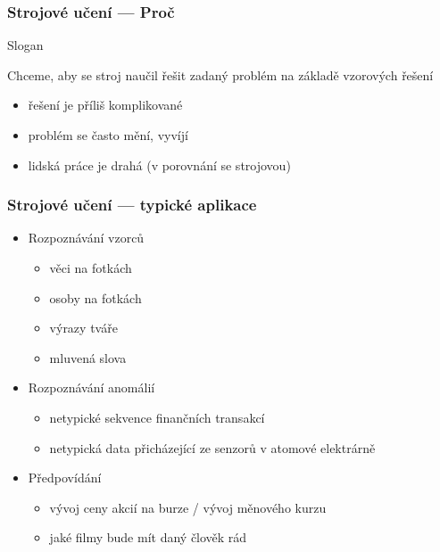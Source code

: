 \documentclass[red,professionalfont]{beamer}
\theoremstyle{definition}
\newcommand{\0}{\mbox{${\bf 0}$}}
\begin{document}
\begin{frame}\frametitle{Strojové učení --- Proč}
\begin{center}
 Slogan
\end{center}\pause
\begin{block}{}
 \begin{center} 
  Chceme, aby se stroj naučil řešit zadaný problém na základě vzorových řešení
 \end{center}
\end{block}\pause
\begin{itemize}
 \item řešení je příliš komplikované\pause
 \item problém se často mění, vyvíjí\pause
 \item lidská práce je drahá (v porovnání se strojovou)
\end{itemize}
\end{frame}

\begin{frame}\frametitle{Strojové učení --- typické aplikace}
\begin{itemize}
 \item Rozpoznávání vzorců\pause
 \begin{itemize}
 \item věci na fotkách\pause
 \item osoby na fotkách\pause
 \item výrazy tváře\pause
 \item mluvená slova\pause
 \end{itemize}
 \item Rozpoznávání anomálií\pause
 \begin{itemize}
 \item netypické sekvence finančních transakcí\pause
 \item netypická data přicházející ze senzorů v atomové elektrárně\pause
 \end{itemize}
 \item Předpovídání
 \begin{itemize}
 \item vývoj ceny akcií na burze / vývoj měnového kurzu\pause
 \item jaké filmy bude mít daný člověk rád
 \end{itemize}
\end{itemize}
\end{frame}
\end{document}

